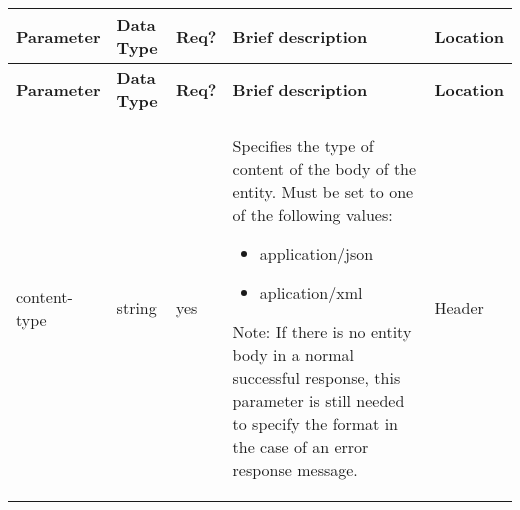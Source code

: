 {\footnotesize{}}%
\begin{longtable}{|>{\raggedright}p{}|>{\raggedright}p{}|>{\raggedright}p{}|>{\raggedright}p{}|>{\raggedright}p{}|}
\hline
\hline 
\textbf{\footnotesize{Parameter }} & \textbf{\footnotesize{Data Type}} & \textbf{\footnotesize{Req?}} & \textbf{\footnotesize{Brief description}} & \textbf{\footnotesize{Location}}\tabularnewline
\hline 
\hline
\endfirsthead
\hline
\hline 
\textbf{\footnotesize{Parameter }} & \textbf{\footnotesize{Data Type}} & \textbf{\footnotesize{Req?}} & \textbf{\footnotesize{Brief description}} & \textbf{\footnotesize{Location}}\tabularnewline
\hline 
\hline
\endhead
\hline 
{\footnotesize{content-type}} & {\footnotesize{string}} & {\footnotesize{yes}} & {\footnotesize{Specifies the type of content of the body of the entity.
Must be set to one of the following values:}}{\footnotesize \par}
\begin{itemize}
\item {\footnotesize{application/json}}{\footnotesize \par}
\item {\footnotesize{aplication/xml}}{\footnotesize \par}
\end{itemize}
{\footnotesize{Note: If there is no entity body in a normal successful
response, this parameter is still needed to specify the format in
the case of an error response message.}} & {\footnotesize{Header}}\tabularnewline
\hline 
\end{longtable}{\footnotesize \par}

{\footnotesize{}}

